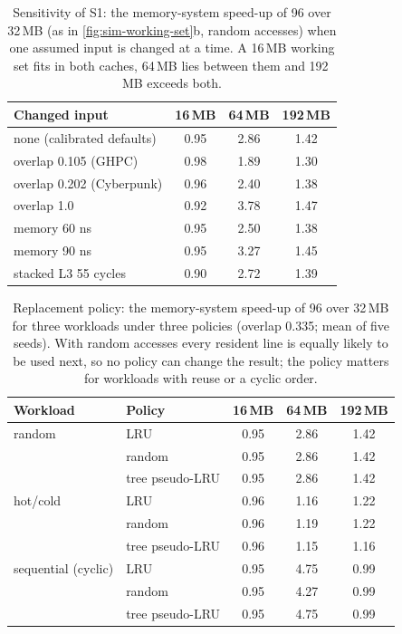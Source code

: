 \begin{table}[htbp]
  \centering
  \caption[Sensitivity of S1 to the assumed inputs]{Sensitivity of S1: the memory-system speed-up of 96 over 32\,MB (as in \cref{fig:sim-working-set}b, random accesses) when one assumed input is changed at a time. A 16\,MB working set fits in both caches, 64\,MB lies between them and 192\,MB exceeds both.}
  \label{tab:sim-sensitivity}
  \small
  \begin{tabular}{@{}lccc@{}}
    \toprule
    \textbf{Changed input} & \textbf{16\,MB} & \textbf{64\,MB} & \textbf{192\,MB} \\
    \midrule
    none (calibrated defaults) & 0.95 & 2.86 & 1.42 \\
    overlap 0.105 (GHPC) & 0.98 & 1.89 & 1.30 \\
    overlap 0.202 (Cyberpunk) & 0.96 & 2.40 & 1.38 \\
    overlap 1.0 & 0.92 & 3.78 & 1.47 \\
    memory 60 ns & 0.95 & 2.50 & 1.38 \\
    memory 90 ns & 0.95 & 3.27 & 1.45 \\
    stacked L3 55 cycles & 0.90 & 2.72 & 1.39 \\
    \bottomrule
  \end{tabular}
\end{table}
\begin{table}[htbp]
  \centering
  \caption[Replacement policy and the gain from a larger L3]{Replacement policy: the memory-system speed-up of 96 over 32\,MB for three workloads under three policies (overlap 0.335; mean of five seeds). With random accesses every resident line is equally likely to be used next, so no policy can change the result; the policy matters for workloads with reuse or a cyclic order.}
  \label{tab:sim-policy}
  \small
  \begin{tabular}{@{}llccc@{}}
    \toprule
    \textbf{Workload} & \textbf{Policy} & \textbf{16\,MB} & \textbf{64\,MB} & \textbf{192\,MB} \\
    \midrule
    random & LRU & 0.95 & 2.86 & 1.42 \\
     & random & 0.95 & 2.86 & 1.42 \\
     & tree pseudo-LRU & 0.95 & 2.86 & 1.42 \\
    hot/cold & LRU & 0.96 & 1.16 & 1.22 \\
     & random & 0.96 & 1.19 & 1.22 \\
     & tree pseudo-LRU & 0.96 & 1.15 & 1.16 \\
    sequential (cyclic) & LRU & 0.95 & 4.75 & 0.99 \\
     & random & 0.95 & 4.27 & 0.99 \\
     & tree pseudo-LRU & 0.95 & 4.75 & 0.99 \\
    \bottomrule
  \end{tabular}
\end{table}

